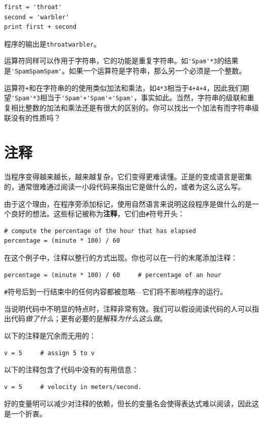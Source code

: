 \beforeverb
\begin{verbatim}
first = 'throat'
second = 'warbler'
print first + second
\end{verbatim}
\afterverb
%
程序的输出是{\tt throatwarbler}。

运算符{\tt *}同样可以作用于字符串，它的功能是重复字符串。如\verb"'Spam'*3"的结果是\verb"'SpamSpamSpam'"。如果一个运算符是字符串，那么另一个必须是一个整数。

运算符{\tt +}和{\tt *}在字符串的的使用类似加法和乘法，如{\tt 4*3}相当于{\tt 4+4+4}，因此我们期望\verb"'Spam'*3"相当于\verb"'Spam'+'Spam'+'Spam'"，事实如此。当然，字符串的级联和重复相比整数的加法和乘法还是有很大的区别的。你可以找出一个加法有而字符串级联没有的性质吗？




\section{注释}

当程序变得越来越长，越来越复杂，它们变得更难读懂。正是的变成语言是密集的，通常很难通过阅读一小段代码来指出它是做什么的，或者为这么这么写。

由于这个理由，在程序旁添加标记，使用自然语言来说明这段程序是做什么的是一个良好的想法。这些标记被称为{\bf 注释}，它们由\verb"#"符号开头：

\beforeverb
\begin{verbatim}
# compute the percentage of the hour that has elapsed
percentage = (minute * 100) / 60
\end{verbatim}
\afterverb
%
在这个例子中，注释以整行的方式出现。你也可以在一行的末尾添加注释：

\beforeverb
\begin{verbatim}
percentage = (minute * 100) / 60     # percentage of an hour
\end{verbatim}
\afterverb
%
{\tt \#}符号后到一行结束中的任何内容都被忽略---它们将不影响程序的运行。

当说明代码中不明显的特点时，注释非常有效。我们可以假设阅读代码的人可以指出代码{\em 做了什么}；更有必要的是解释{\em 为什么这么做}。

以下的注释是冗余而无用的：

\beforeverb
\begin{verbatim}
v = 5     # assign 5 to v
\end{verbatim}
\afterverb
%
以下的注释包含了代码中没有的有用信息：

\beforeverb
\begin{verbatim}
v = 5     # velocity in meters/second. 
\end{verbatim}
\afterverb
%
好的变量明可以减少对注释的依赖，但长的变量名会使得表达式难以阅读，因此这是一个折衷。


